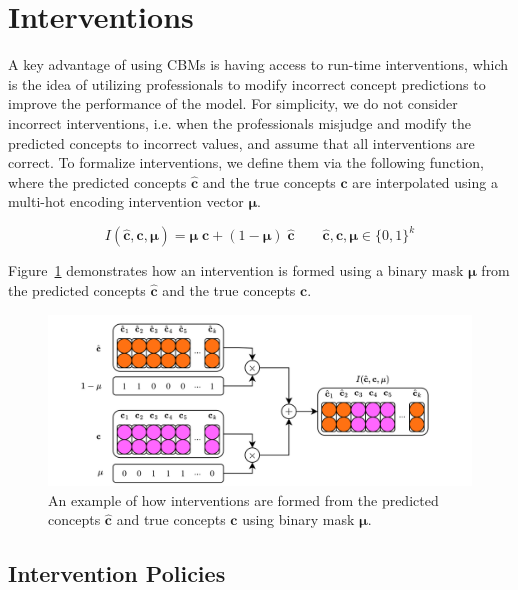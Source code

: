 \section{Interventions}
A key advantage of using CBMs is having access to 
run-time interventions, which is the idea of utilizing professionals
to modify incorrect concept predictions to improve the 
performance of the model.
For simplicity, we do not consider incorrect interventions, 
i.e. when the professionals misjudge and modify
 the predicted concepts to incorrect values,
and assume that
all interventions are correct. To formalize interventions, we define
them via the following function, where
the predicted concepts $\hat{\mathbf{c}}$ and the true concepts $\mathbf{c}$ are interpolated
using a multi-hot encoding intervention vector $\bm{\mu}$.

\[I(\hat{\mathbf{c}}, \mathbf{c}, \bm{\mu}) = 
\bm{\mu} \; \mathbf{c} + (1 - \bm{\mu}) \; \hat{\mathbf{c}} \qquad \hat{\mathbf{c}}, \mathbf{c}, \bm{\mu} \in \{0, 1\}^k\]

Figure~\ref{fig:interventions} demonstrates how an intervention
is formed using 
a binary mask $\bm{\mu}$ from the predicted concepts $\hat{\mathbf{c}}$ and the true concepts $\mathbf{c}$.

\begin{figure}[!ht]
    \centering
    \includegraphics[width=\textwidth]{figs/method/interventions.png}
    \caption{An example of how interventions are formed from the predicted concepts $\hat{\mathbf{c}}$
    and true concepts $\mathbf{c}$
     using binary mask $\bm{\mu}$.}
    \label{fig:interventions}
\end{figure}

\subsection{Intervention Policies}


